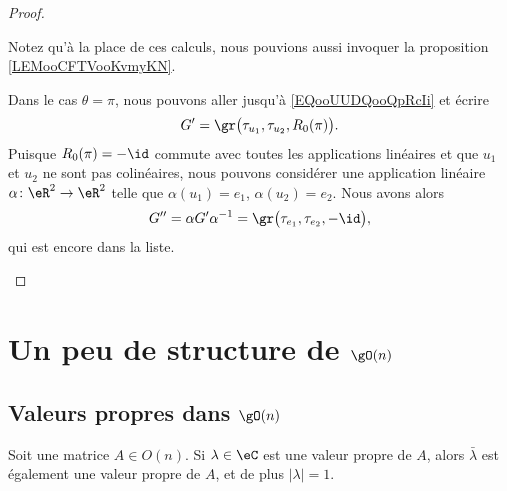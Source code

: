 \begin{proof}
\begin{subproof}
		Notez qu'à la place de ces calculs, nous pouvions aussi invoquer la proposition \ref{LEMooCFTVooKvmyKN}.

		\spitem[Le cas \( L=\{ -\id \}\)]
		Dans le cas \( \theta=\pi\), nous pouvons aller jusqu'à \eqref{EQooUUDQooQpRcIi} et écrire
		\begin{equation}
			G'=\gr\big( \tau_{u_1}, \tau_{u_2}, R_0(\pi) \big).
		\end{equation}
		Puisque \( R_0(\pi)=-\id\) commute avec toutes les applications linéaires et que \( u_1\) et \( u_2\) ne sont pas colinéaires, nous pouvons considérer une application linéaire \( \alpha\colon \eR^2\to \eR^2\) telle que \( \alpha(u_1)=e_1\), \( \alpha(u_2)=e_2\). Nous avons alors
		\begin{equation}
			G''=\alpha G'\alpha^{-1}=\gr\big( \tau_{e_1}, \tau_{e_2},-\id \big),
		\end{equation}
		qui est encore dans la liste.
	\end{subproof}
\end{proof}

\section{Un peu de structure de \texorpdfstring{\( \gO(n)\)}{O(n)}}

\subsection{Valeurs propres dans \( \gO(n)\)}

\begin{proposition}      \label{PROPooVEJGooWnqtMm}
	Soit une matrice \( A\in O(n)\). Si \( \lambda\in \eC\) est une valeur propre de \( A\), alors \( \bar\lambda\) est également une valeur propre de \( A\), et de plus \( | \lambda |=1\).
\end{proposition}

